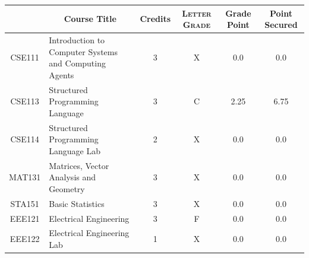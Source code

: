 \documentclass[11pt]{article}
\newcommand*{\numtwo}[1]{\pgfmathprintnumber[
                    fixed, precision=2, fixed zerofill=true]{#1}}
\begin{document}
                \begin{center}
                    \renewcommand{\arraystretch}{1.08}
                    
                \begin{tabular}{|c|l|c|>{\scshape}c|c|c|}
                \hline  \rule[-1ex]{0pt}{3.5ex} {\centering{\bf Course Code}} &  \multicolumn{1}{c|}{\textbf{Course Title}}  & {\bf Credits} & {\bf Letter Grade} & {\bf Grade Point} & {\bf Point Secured}  \\ 
                \hline   CSE111 &  Introduction to Computer Systems and Computing Agents		 & 3 & X & 0.0 & 0.0 \\ %
                \hline   CSE113 &  Structured Programming Language		 & 3 & C & 2.25 & 6.75 \\ %
                \hline   CSE114 &  Structured Programming Language Lab		 & 2 & X & 0.0 & 0.0 \\ %
                \hline   MAT131 &  Matrices, Vector Analysis and Geometry		 & 3 & X & 0.0 & 0.0 \\ %
                \hline   STA151 &  Basic Statistics		 & 3 & X & 0.0 & 0.0 \\ %
                \hline   EEE121 &  Electrical Engineering		 & 3 & F & 0.0 & 0.0 \\ %
                \hline   EEE122 &  Electrical Engineering Lab		 & 1 & X & 0.0 & 0.0 \\ %

\hline                %
                \end{tabular}
                \end{center}
                \renewcommand{\arraystretch}{1.03}
\end{document}
